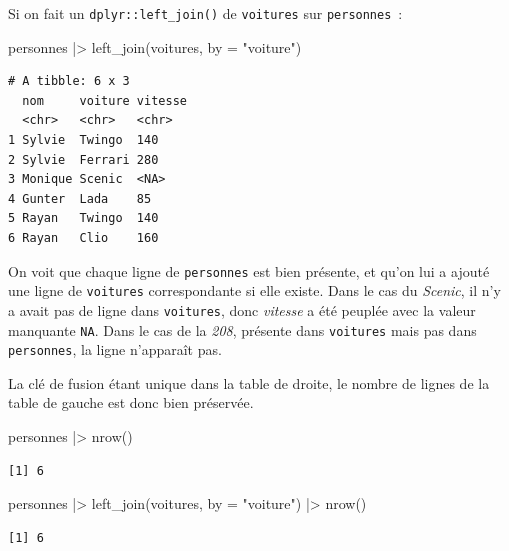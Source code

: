 \documentclass[
  letterpaper,
  DIV=11,
  numbers=noendperiod,
  oneside]{scrreprt}
\newenvironment{Shaded}{\begin{snugshade}}{\end{snugshade}}
\newcommand{\AttributeTok}[1]{\textcolor[rgb]{0.40,0.45,0.13}{#1}}
\newcommand{\FunctionTok}[1]{\textcolor[rgb]{0.28,0.35,0.67}{#1}}
\newcommand{\NormalTok}[1]{\textcolor[rgb]{0.00,0.23,0.31}{#1}}
\newcommand{\SpecialCharTok}[1]{\textcolor[rgb]{0.37,0.37,0.37}{#1}}
\newcommand{\StringTok}[1]{\textcolor[rgb]{0.13,0.47,0.30}{#1}}
\begin{document}
Si on fait un \texttt{dplyr::left\_join()} de \texttt{voitures} sur
\texttt{personnes}~:

\begin{Shaded}
\begin{Highlighting}[]
\NormalTok{personnes }\SpecialCharTok{|\textgreater{}} \FunctionTok{left\_join}\NormalTok{(voitures, }\AttributeTok{by =} \StringTok{"voiture"}\NormalTok{)}
\end{Highlighting}
\end{Shaded}

\begin{verbatim}
# A tibble: 6 x 3
  nom     voiture vitesse
  <chr>   <chr>   <chr>  
1 Sylvie  Twingo  140    
2 Sylvie  Ferrari 280    
3 Monique Scenic  <NA>   
4 Gunter  Lada    85     
5 Rayan   Twingo  140    
6 Rayan   Clio    160    
\end{verbatim}

On voit que chaque ligne de \texttt{personnes} est bien présente, et
qu'on lui a ajouté une ligne de \texttt{voitures} correspondante si elle
existe. Dans le cas du \emph{Scenic}, il n'y a avait pas de ligne dans
\texttt{voitures}, donc \emph{vitesse} a été peuplée avec la valeur
manquante \texttt{NA}. Dans le cas de la \emph{208}, présente dans
\texttt{voitures} mais pas dans \texttt{personnes}, la ligne n'apparaît
pas.

La clé de fusion étant unique dans la table de droite, le nombre de
lignes de la table de gauche est donc bien préservée.

\begin{Shaded}
\begin{Highlighting}[]
\NormalTok{personnes }\SpecialCharTok{|\textgreater{}} \FunctionTok{nrow}\NormalTok{()}
\end{Highlighting}
\end{Shaded}

\begin{verbatim}
[1] 6
\end{verbatim}

\begin{Shaded}
\begin{Highlighting}[]
\NormalTok{personnes }\SpecialCharTok{|\textgreater{}} \FunctionTok{left\_join}\NormalTok{(voitures, }\AttributeTok{by =} \StringTok{"voiture"}\NormalTok{) }\SpecialCharTok{|\textgreater{}} \FunctionTok{nrow}\NormalTok{()}
\end{Highlighting}
\end{Shaded}

\begin{verbatim}
[1] 6
\end{verbatim}
\end{document}
